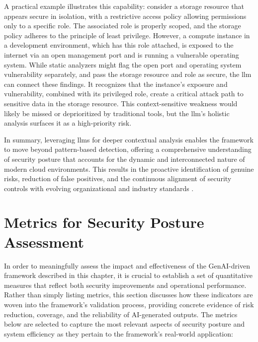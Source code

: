 A practical example illustrates this capability: consider a storage resource that appears secure in isolation, with a restrictive access policy allowing permissions only to a specific role. The associated role is properly scoped, and the storage policy adheres to the principle of least privilege. However, a compute instance in a development environment, which has this role attached, is exposed to the internet via an open management port and is running a vulnerable operating system. While static analyzers might flag the open port and operating system vulnerability separately, and pass the storage resource and role as secure, the \gls{llm} can connect these findings. It recognizes that the instance’s exposure and vulnerability, combined with its privileged role, create a critical attack path to sensitive data in the storage resource. This context-sensitive weakness would likely be missed or deprioritized by traditional tools, but the \gls{llm}’s holistic analysis surfaces it as a high-priority risk.

In summary, leveraging \glspl{llm} for deeper contextual analysis enables the framework to move beyond pattern-based detection, offering a comprehensive understanding of security posture that accounts for the dynamic and interconnected nature of modern cloud environments. This results in the proactive identification of genuine risks, reduction of false positives, and the continuous alignment of security controls with evolving organizational and industry standards \cite{haque_sok_2025}.


\section{Metrics for Security Posture Assessment} %
\label{sec:Metrics for Security Posture Assessment}

In order to meaningfully assess the impact and effectiveness of the GenAI-driven framework described in this chapter, it is crucial to establish a set of quantitative measures that reflect both security improvements and operational performance. Rather than simply listing metrics, this section discusses how these indicators are woven into the framework's validation process, providing concrete evidence of risk reduction, coverage, and the reliability of AI-generated outputs. The metrics below are selected to capture the most relevant aspects of security posture and system efficiency as they pertain to the framework's real-world application:

